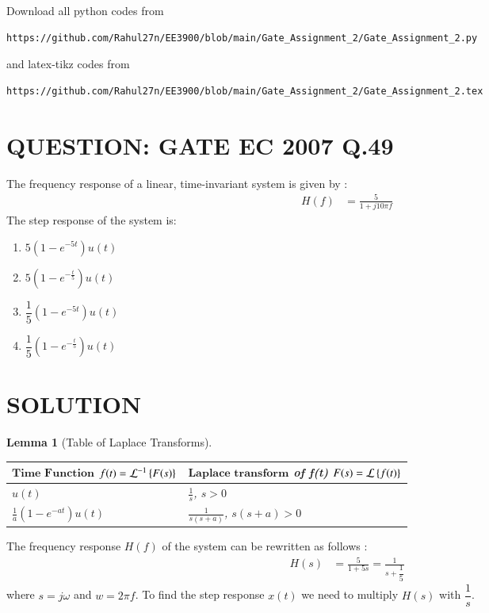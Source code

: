 \documentclass[journal,12pt,twocolumn]{IEEEtran}
\newtheorem{lemma}[theorem]{Lemma}
\begin{document}
\maketitle
\newpage
\bigskip
\renewcommand{\thefigure}{\theenumi}
\renewcommand{\thetable}{\theenumi}
Download all python codes from 
\begin{lstlisting}
https://github.com/Rahul27n/EE3900/blob/main/Gate_Assignment_2/Gate_Assignment_2.py
\end{lstlisting}
%
and latex-tikz codes from 
%
\begin{lstlisting}
https://github.com/Rahul27n/EE3900/blob/main/Gate_Assignment_2/Gate_Assignment_2.tex
\end{lstlisting}
\vspace{0.5cm}
\section{QUESTION: GATE EC 2007 Q.49}
The frequency response of a linear, time-invariant system is given by :
\begin{align}
H(f) &= \frac{5}{1 + j10\pi f} \nonumber
\end{align}
 The step response of the system is:
\begin{enumerate}[label=(\Alph*)]
\item $5(1-e^{-5t})u(t)$\\
\item $5(1-e^{-\frac{t}{5}})u(t)$\\
\item $\dfrac{1}{5}(1-e^{-5t})u(t)$\\ 
\item $\dfrac{1}{5}(1-e^{-\frac{t}{5}})u(t)$ 
\end{enumerate}
\section{SOLUTION}
\begin{lemma}[Table of Laplace Transforms]\label{tbl}
\begin{center}
\begin{tabular}{ |m{3cm}|m{}| } 
 \hline
 $\textbf{Time Function}$ $f(t)=\mathcal{L}^{-1}\left\{F(s)\right\}$ & $\textbf{Laplace transform}$ of f(t) $F(s)=\mathcal{L}\left\{f(t)\right\}$ \\ 
 \hline
 $u(t)$ & $\frac{1}{s}$, $s>0$ \\ 
 \hline
 $\frac{1}{a}(1-e^{-at})u(t)$ & $\frac{1}{s(s+a)}$, $s(s+a)>0$\\
 \hline
\end{tabular}
\end{center}
\end{lemma}
The frequency response $H(f)$ of the system can be rewritten as follows :
\begin{align}
H(s) &= \frac{5}{1+5s} = \frac{1}{s + \dfrac{1}{5}}\label{eq:1}
\end{align}
where $s = j\omega$ and $w = 2\pi f$. To find the step response $x(t)$ we need to multiply $H(s)$ with $\dfrac{1}{s}$.
\end{document}
